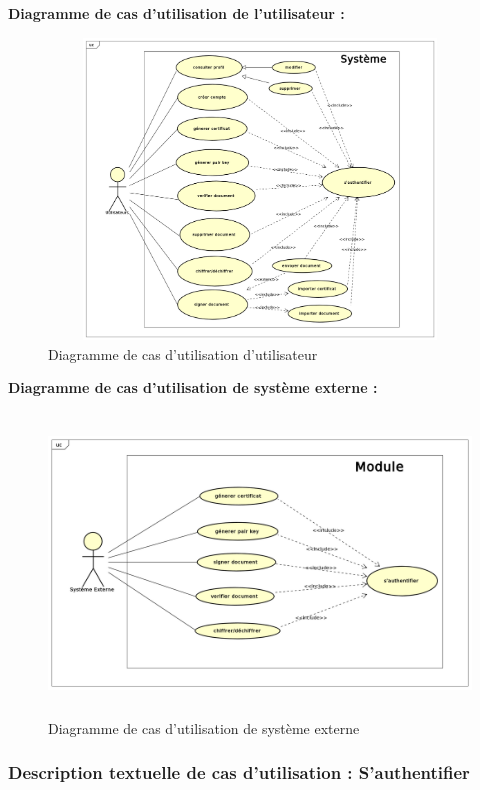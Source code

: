 \documentclass[12pt,a4paper]{article}
\begin{document}
		\textbf{Diagramme de cas d'utilisation de l'utilisateur :}
			\begin{figure}[H]
					\centering		
					\includegraphics[width=18cm, height=8cm]{../Diagrammes/DiagrammeDeCasDutilisation/users.png}  
					\caption{Diagramme de cas d'utilisation d'utilisateur}
					\label{fig4}
			\end{figure}
			
			
	
			\textbf{Diagramme de cas d'utilisation de système externe :}
			\begin{figure}[H]
					\centering		
					\includegraphics[width=18cm, height=8cm]{../Diagrammes/DiagrammeDeCasDutilisation/systemeexterne.png}  
					\caption{Diagramme de cas d'utilisation de système externe}
					\label{fig5}
			\end{figure}
			
	
			\subsubsection{Description textuelle de cas d'utilisation : S'authentifier}
			
\end{document}
